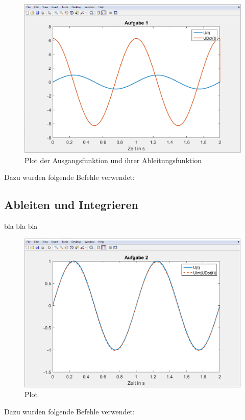 \documentclass[%
  a4paper, %
  12pt, %
   article, %
  titlepage
]{scrartcl}
\begin{document}
\begin{figure}[h]
\includegraphics[width=\textwidth]{plot1.png}
\caption{Plot der Ausgangsfunktion und ihrer Ableitungsfunktion}
\label{fig3}
\end{figure}

Dazu wurden folgende Befehle verwendet:



\newpage

 \subsection{Ableiten und Integrieren}

bla bla bla

\begin{figure}[h]
\includegraphics[width=\textwidth]{plot2.png}
\caption{Plot}
\label{fig4}
\end{figure}

Dazu wurden folgende Befehle verwendet:



\newpage
\end{document}
